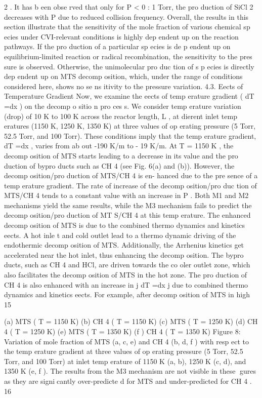 \documentclass[10pt, letterpaper]{article}
\begin{document}
2
. It has b een obse rved that
only for
P <
0
:
1 Torr, the pro duction of SiCl
2
decreases with
P
due to reduced collision frequency.
Overall, the results in this section illustrate that the sensitivity of the mole fraction of various chemical
sp ecies under CVI-relevant conditions is highly dep endent up on the reaction pathways. If the pro duction of a
particular sp ecies is de p endent up on equilibrium-limited reaction or radical recombination, the sensitivity to
the pres sure is observed. Otherwise, the unimolecular pro duc tion of s p ecies is directly dep endent up on MTS
decomp osition, which, under the range of conditions considered here, shows no se ns itivity to the pressure
variation.
4.3. Eects of Temperature Gradient
Now, we examine the eects of temp erature gradient (
dT =dx
) on the decomp o sitio n pro ces s. We consider
temp erature variation (drop) of 10 K to 100 K across the reactor length,
L
, at dierent inlet temp eratures
(1150 K, 1250 K, 1350 K) at three values of op erating pressure (5 Torr, 52.5 Torr, and 100 Torr). These
conditions imply that the temp erature gradient,
dT =dx
, varies from ab out -190 K/m to - 19 K/m.
At
T
= 1150
K
, the decomp osition of MTS starts leading to a decrease in its value and the pro duction of
bypro ducts such as CH
4
(see Fig. 6(a) and (b)). However, the decomp osition/pro duction of MTS/CH
4
is en-
hanced due to the pre sence of a temp erature gradient. The rate of increase of the decomp osition/pro duc tion
of MTS/CH
4
tends to a constant value with an increase in
P
. Both M1 and M2 mechanisms yield the
same results, while the M3 mechanism fails to predict the decomp osition/pro duction of MT S/CH
4
at this
temp erature.
The enhanced decomp osition of MTS is due to the combined thermo dynamics and kinetics eects. A
hot inle t and cold outlet lead to a thermo dynamic driving of the endothermic decomp osition of MTS.
Additionally, the Arrhenius kinetics get accelerated near the hot inlet, thus enhancing the decomp osition.
The bypro ducts, such as CH
4
and HCl, are driven towards the co oler outlet zone, which also facilitates the
decomp osition of MTS in the hot zone. The pro duction of CH
4
is also enhanced with an increase in
j
dT =dx
j
due to combined thermo dynamics and kinetics eects. For example, after decomp osition of MTS in high
15


(a) MTS (
T
= 1150 K)
(b) CH
4
(
T
= 1150 K)
(c) MTS (
T
= 1250 K)
(d) CH
4
(
T
= 1250 K)
(e) MTS (
T
= 1350 K)
(f ) CH
4
(
T
= 1350 K)
Figure 8: Variation of mole fraction of MTS (a, c, e) and CH
4
(b, d, f ) with resp ect to the temp erature gradient at three values
of op erating pressure (5 Torr, 52.5 Torr, and 100 Torr) at inlet temp erature of 1150 K (a, b), 1250 K (c, d), and 1350 K (e,
f ). The results from the M3 mechanism are not visible in these gures as they are signicantly over-predicte d for MTS and
under-predicted for CH
4
.
16
\end{document}
